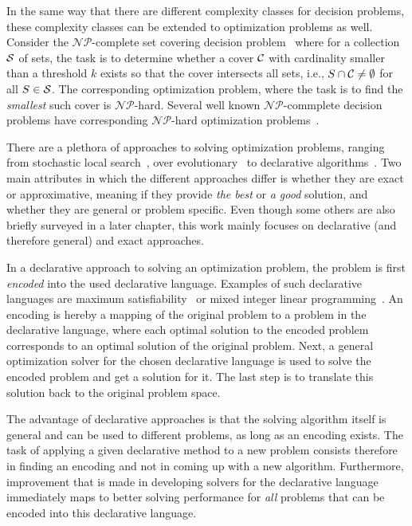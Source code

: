 In the same way that there are different complexity classes for decision problems, these complexity classes can be extended to optimization problems as well.
Consider the $\mathcal{NP}$-complete set covering decision problem~\autocite{DBLP:conf/coco/Karp72} where for a collection $\mathcal{S}$ of sets, the task is to determine whether a cover $\mathcal{C}$ with cardinality smaller than a threshold $k$ exists so that the cover intersects all sets, i.e., $S \cap \mathcal{C} \neq \emptyset$ for all $S\in\mathcal{S}$.
The corresponding optimization problem, where the task is to find the \emph{smallest} such cover is $\mathcal{NP}$-hard.
Several well known $\mathcal{NP}$-commplete decision problems have corresponding $\mathcal{NP}$-hard optimization problems~\autocite{KorteVygen2018-15}.

There are a plethora of approaches to solving optimization problems, ranging from stochastic local search~\autocite{}, over evolutionary~\autocite{Dasgupta2013,DBLP:journals/jgo/StornP97} to declarative algorithms~\autocite{}.
Two main attributes in which the different approaches differ is whether they are exact or approximative, meaning if they provide \emph{the best} or \emph{a good} solution, and whether they are general or problem specific.
Even though some others are also briefly surveyed in a later chapter, this work mainly focuses on declarative (and therefore general) and exact approaches.

In a declarative approach to solving an optimization problem, the problem is first \emph{encoded} into the used declarative language.
Examples of such declarative languages are maximum satisfiability~\autocite{handbook2-maxsat} or mixed integer linear programming~\autocite{ChenEtAl2010AppliedIntegerProgramming,KorteVygen2018-5}.
An encoding is hereby a mapping of the original problem to a problem in the declarative language, where each optimal solution to the encoded problem corresponds to an optimal solution of the original problem.
Next, a general optimization solver for the chosen declarative language is used to solve the encoded problem and get a solution for it.
The last step is to translate this solution back to the original problem space.

The advantage of declarative approaches is that the solving algorithm itself is general and can be used to different problems, as long as an encoding exists.
The task of applying a given declarative method to a new problem consists therefore in finding an encoding and not in coming up with a new algorithm.
Furthermore, improvement that is made in developing solvers for the declarative language immediately maps to better solving performance for \emph{all} problems that can be encoded into this declarative language.

